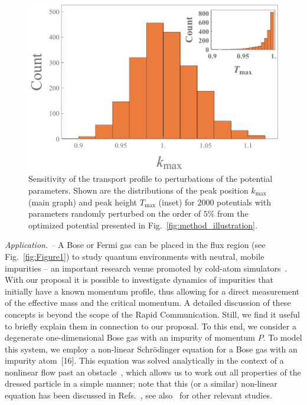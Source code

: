 \documentclass[twocolumn,amsmath,amssymb,showpacs,pra,superscriptaddress,aps]{revtex4-1}
\begin{document}
\begin{figure}
   \includegraphics[width=1\linewidth]{plot_sensitivity.pdf}
 \caption[Sensitivity Plot]{Sensitivity of the transport profile to perturbations of the potential parameters. Shown are the distributions of the peak position $k_{\mathrm{max}}$ (main graph) and peak height $T_{\mathrm{max}}$ (inset) for 2000 potentials with parameters randomly perturbed on the order of $5\%$ from the optimized potential presented in Fig.~\ref{fig:method_illustration}.}
 \label{fig:sensitivity}
\end{figure}



{\it Application. --} A Bose or Fermi gas can be placed in the flux region  (see Fig.~\ref{fig:Figure1}) to study quantum environments with neutral, mobile impurities -- an important research venue promoted by cold-atom simulators~\cite{zwierlein2009,salomon2009,grimm2012, widera2012, catani2012, fukuhara2013, hu2016,arlt2016,zaccanti2017,ardila2018}. With our proposal it is possible to investigate dynamics of impurities that initially have a known momentum profile, thus allowing for a direct measurement of the effective mass and the critical momentum. A detailed discussion of these concepts is beyond the scope of the Rapid Communication. Still, we find it useful to briefly explain them in connection to our proposal. To this end, we consider a degenerate one-dimensional Bose gas with an impurity of momentum $P$. To model this system, we employ a non-linear Schr{\"o}dinger equation for a Bose gas with an impurity atom~[16]. This equation was solved analytically in the context of a nonlinear flow past an obstacle~\cite{hakim1997}, which allows us to work out all properties of the dressed particle in a simple manner; note that this (or a similar) non-linear equation has been discussed in Refs.~\cite{kamenev2016, volosniev2017, mistakidis2018, dehkharghani2018, pastukhov2018,pastukhov2019}, see also~\cite{sacha2006, catani2012, kain2016, parisi2017,grusdt2017, pastukhov2017, kain2018} for other relevant studies. 
\end{document}
